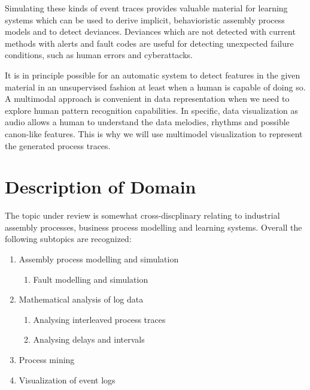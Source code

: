 \documentclass[a4paper,10pt]{article}
\begin{document}
Simulating these kinds of event traces provides valuable material for learning systems which can be used to derive implicit, behavioristic assembly process models and
to detect deviances. Deviances which are not detected with current methods with alerts and fault codes are useful for detecting unexpected failure conditions, such as
human errors and cyberattacks.

It is in principle possible for an automatic system to detect features in the given material in an unsupervised fashion at least when a human is capable of doing so.
A multimodal approach is convenient in data representation when we need to explore human pattern recognition capabilities. In specific, data visualization as audio
allows a human to understand the data melodies, rhythms and possible canon-like features. This is why we will use multimodel visualization to represent the generated
process traces.

\section{Description of Domain}

The topic under review is somewhat cross-discplinary relating to industrial assembly processes, business process modelling and learning systems.
Overall the following subtopics are recognized:
\begin{enumerate}
 \item Assembly process modelling and simulation
   \begin{enumerate}
     \item Fault modelling and simulation
   \end{enumerate}
 \item Mathematical analysis of log data
   \begin{enumerate}
     \item Analysing interleaved process traces
     \item Analysing delays and intervals
   \end{enumerate}
 \item Process mining
 \item Visualization of event logs
\end{enumerate}
\end{document}
